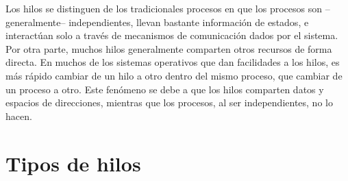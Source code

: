 \documentclass{article}
\begin{document}
Los hilos se distinguen de los tradicionales procesos en que los procesos son –generalmente– independientes, llevan bastante información de estados, e interactúan solo a través de mecanismos de comunicación dados por el sistema. Por otra parte, muchos hilos generalmente comparten otros recursos de forma directa. En muchos de los sistemas operativos que dan facilidades a los hilos, es más rápido cambiar de un hilo a otro dentro del mismo proceso, que cambiar de un proceso a otro. Este fenómeno se debe a que los hilos comparten datos y espacios de direcciones, mientras que los procesos, al ser independientes, no lo hacen.

\section{Tipos de hilos}



\end{document}
